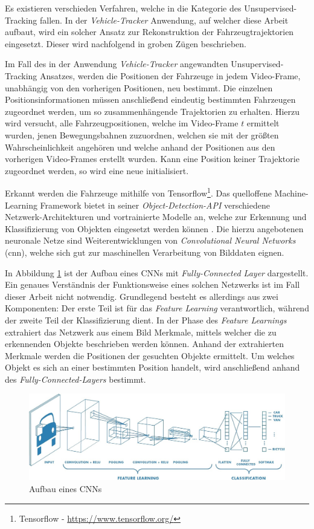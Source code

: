 Es existieren verschieden Verfahren, welche in die Kategorie des Unsupervised-Tracking fallen. In
der \textit{Vehicle-Tracker} Anwendung, auf welcher diese Arbeit aufbaut, wird ein solcher Ansatz zur
Rekonstruktion der Fahrzeugtrajektorien eingesetzt. Dieser wird nachfolgend in groben Zügen beschrieben.

Im Fall des in der Anwendung \textit{Vehicle-Tracker} angewandten Unsupervised-Tracking Ansatzes, werden die
Positionen der Fahrzeuge in jedem Video-Frame, unabhängig von den vorherigen Positionen, neu bestimmt.
Die einzelnen Positionsinformationen müssen anschließend eindeutig bestimmten Fahrzeugen zugeordnet werden, um so
zusammenhängende Trajektorien zu erhalten.
Hierzu wird versucht, alle Fahrzeugpositionen, welche im Video-Frame $t$ ermittelt wurden, jenen Bewegungsbahnen
zuzuordnen, welchen sie mit der größten Wahrscheinlichkeit angehören und welche anhand der Positionen aus den
vorherigen Video-Frames erstellt wurden. Kann eine Position keiner Trajektorie zugeordnet werden,
so wird eine neue initialisiert.

Erkannt werden die Fahrzeuge mithilfe von Tensorflow\footnote{Tensorflow - \url{https://www.tensorflow.org/}}.
Das quelloffene Machine-Learning Framework bietet in seiner \textit{Object-Detection-API}
verschiedene Netzwerk-Architekturen und vortrainierte Modelle an, welche zur Erkennung und Klassifizierung
von Objekten eingesetzt werden können \cite[]{Huang2018}. Die hierzu angebotenen neuronale Netze sind Weiterentwicklungen
von \textit{Convolutional Neural Networks} (\acrshort*{cnn}), welche sich gut zur maschinellen Verarbeitung
von Bilddaten eignen.

In Abbildung \ref{fig:grund_structure_cnn} ist der Aufbau eines CNNs mit \textit{Fully-Connected Layer} dargestellt.
Ein genaues Verständnis der Funktionsweise eines solchen Netzwerks ist im Fall dieser Arbeit nicht notwendig.
Grundlegend besteht es allerdings aus zwei Komponenten: Der erste Teil ist für
das \textit{Feature Learning} verantwortlich, während der zweite Teil der Klassifizierung dient.
In der Phase des \textit{Feature Learnings} extrahiert das Netzwerk aus einem Bild Merkmale, mittels
welcher die zu erkennenden Objekte beschrieben werden können. Anhand der extrahierten Merkmale werden die Positionen
der gesuchten Objekte ermittelt. Um welches Objekt es sich an einer bestimmten Position handelt, wird anschließend anhand
des \textit{Fully-Connected-Layers} bestimmt.

\begin{figure}[H]
    \centering
    \includegraphics[width=0.95\linewidth]{resources/img/grundlagen/TrajectoryReconstruction/cnn_structure}
    \caption[Aufbau eines CNNs]{Aufbau eines CNNs \cite[]{PatelShyamal2017}}
    \label{fig:grund_structure_cnn}
\end{figure}

